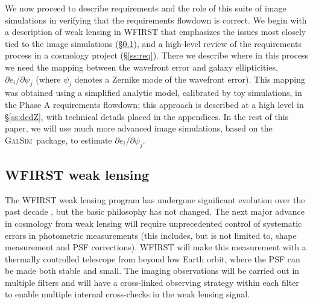 \documentclass[aps,prd, amsmath,amssymb,superscriptaddress,showkeys,nofootinbib,reprint,preprintnumbers]{revtex4-1}
\newcommand{\galsim}{\textsc{GalSim}}
\begin{document}
We now proceed to describe requirements and the role of this suite of image simulations in verifying that the requirements flowdown is correct. We begin with a description of weak lensing in WFIRST that emphasizes the issues most closely tied to the image simulations (\S\ref{ss:wlprog}), and a high-level review of the requirements process in a cosmology project (\S\ref{ss:req}). There we describe where in this process we need the mapping between the wavefront error and galaxy ellipticities, $\partial e_i/\partial \psi_j$ (where $\psi_j$ denotes a Zernike mode of the wavefront error). This mapping was obtained using a simplified analytic model, calibrated by toy simulations, in the Phase A requirements flowdown; this approach is described at a high level in \S\ref{ss:dedZ}, with technical details placed in the appendices. In the rest of this paper, we will use much more advanced image simulations, based on the \galsim\ package, to estimate $\partial e_i/\partial \psi_j$.

\subsection{WFIRST weak lensing}
\label{ss:wlprog}

The WFIRST weak lensing program has undergone significant evolution over the past decade \cite{2011arXiv1108.1374G, 2012arXiv1208.4012G, 2013arXiv1305.5422S, 2015arXiv150303757S, 2018arXiv180403628D, 2019arXiv190205569A}, but the basic philosophy has not changed. The next major advance in cosmology from weak lensing will require unprecedented control of systematic errors in photometric measurements (this includes, but is not limited to, shape measurement and PSF corrections). WFIRST will make this measurement with a thermally controlled telescope from beyond low Earth orbit, where the PSF can be made both stable and small. The imaging observations will be carried out in multiple filters and will have a cross-linked observing strategy within each filter to enable multiple internal cross-checks in the weak lensing signal.
\end{document}

